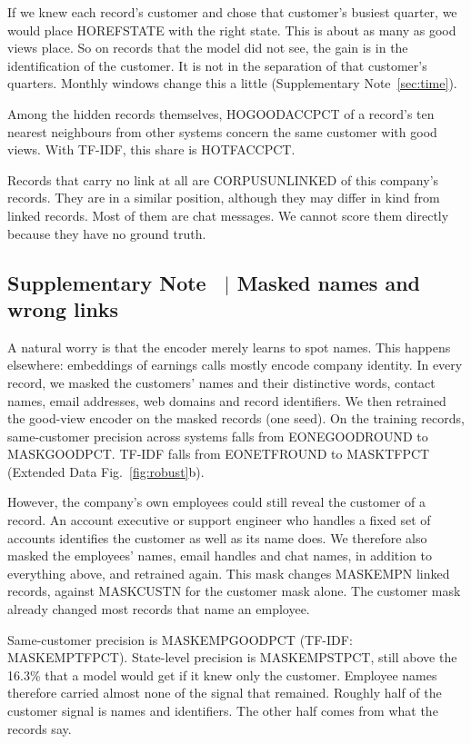 \documentclass[11pt]{article}
\newcounter{suppnote}
\newcommand{\suppnote}[2]{\refstepcounter{suppnote}\label{#2}\subsection{Supplementary Note \thesuppnote\ $|$ #1}}
\begin{document}
If we knew each record's customer and chose that customer's busiest quarter, we would place HOREFSTATE with the right state. This is about as many as good views place. So on records that the model did not see, the gain is in the identification of the customer. It is not in the separation of that customer's quarters. Monthly windows change this a little (Supplementary Note~\ref{sec:time}).

Among the hidden records themselves, HOGOODACCPCT of a record's ten nearest neighbours from other systems concern the same customer with good views. With TF-IDF, this share is HOTFACCPCT.

Records that carry no link at all are CORPUSUNLINKED of this company's records. They are in a similar position, although they may differ in kind from linked records. Most of them are chat messages. We cannot score them directly because they have no ground truth.

\suppnote{Masked names and wrong links}{sec:mask}
\label{sec:noise}
A natural worry is that the encoder merely learns to spot names. This happens elsewhere: embeddings of earnings calls mostly encode company identity\citep{yu2024samecompany}. In every record, we masked the customers' names and their distinctive words, contact names, email addresses, web domains and record identifiers. We then retrained the good-view encoder on the masked records (one seed). On the training records, same-customer precision across systems falls from EONEGOODROUND to MASKGOODPCT. TF-IDF falls from EONETFROUND to MASKTFPCT (Extended Data Fig.~\ref{fig:robust}b).

However, the company's own employees could still reveal the customer of a record. An account executive or support engineer who handles a fixed set of accounts identifies the customer as well as its name does. We therefore also masked the employees' names, email handles and chat names, in addition to everything above, and retrained again. This mask changes MASKEMPN linked records, against MASKCUSTN for the customer mask alone. The customer mask already changed most records that name an employee.

Same-customer precision is MASKEMPGOODPCT (TF-IDF: MASKEMPTFPCT). State-level precision is MASKEMPSTPCT, still above the 16.3\% that a model would get if it knew only the customer. Employee names therefore carried almost none of the signal that remained. Roughly half of the customer signal is names and identifiers. The other half comes from what the records say.
\end{document}

